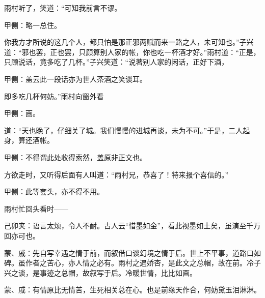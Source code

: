 \begin{parag}
    雨村听了，笑道：“可知我前言不谬。\begin{note}甲侧：略一总住。\end{note}你我方才所说的这几个人，都只怕是那正邪两赋而来一路之人，未可知也。”子兴道：“邪也罢，正也罢，只顾算别人家的帐，你也吃一杯酒才好。”雨村道：“正是，只顾说话，竟多吃了几杯。”子兴笑道：“说著别人家的闲话，正好下酒，\begin{note}甲侧：盖云此一段话亦为世人茶酒之笑谈耳。\end{note}即多吃几杯何妨。”雨村向窗外看\begin{note}甲侧：画。\end{note}道：“天也晚了，仔细关了城。我们慢慢的进城再谈，未为不可。”于是，二人起身，算还酒帐。\begin{note}甲侧：不得谓此处收得索然，盖原非正文也。\end{note}
\end{parag}


\begin{parag}
    方欲走时，又听得后面有人叫道：“雨村兄，恭喜了！特来报个喜信的。”
\end{parag}


\begin{parag}
    \begin{note}甲侧：此等套头，亦不得不用。\end{note}雨村忙回头看时——\begin{note}己卯夹：语言太烦，令人不耐。古人云“惜墨如金”，看此视墨如土矣，虽演至千万回亦可也。\end{note}
\end{parag}


\begin{parag}
    \begin{note}蒙、戚：先自写幸遇之情于前，而叙借口谈幻境之情于后。世上不平事，道路口如碑。虽作者之苦心，亦人情之必有。雨村之遇娇杏，是此文之总帽，故在前。冷子兴之谈，是事迹之总帽，故叙写于后。冷暖世情，比比如画。\end{note}
\end{parag}


\begin{parag}
    \begin{note}蒙、戚：有情原比无情苦，生死相关总在心。也是前缘天作合，何妨黛玉泪淋淋。\end{note}
\end{parag}

